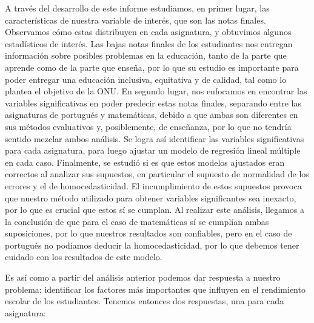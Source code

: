 \documentclass[
]{article}
\begin{document}
A través del desarrollo de este informe estudiamos, en primer lugar, las
características de nuestra variable de interés, que son las notas
finales. Observamos cómo estas distribuyen en cada asignatura, y
obtuvimos algunos estadísticos de interés. Las bajas notas finales de
los estudiantes nos entregan información sobre posibles problemas en la
educación, tanto de la parte que aprende como de la parte que enseña,
por lo que su estudio es importante para poder entregar una educación
inclusiva, equitativa y de calidad, tal como lo plantea el objetivo de
la ONU. En segundo lugar, nos enfocamos en encontrar las variables
significativas en poder predecir estas notas finales, separando entre
las asignaturas de portugués y matemáticas, debido a que ambas son
diferentes en sus métodos evaluativos y, posiblemente, de enseñanza, por
lo que no tendría sentido mezclar ambos análisis. Se logra así
identificar las variables significativas para cada asignatura, para
luego ajustar un modelo de regresión lineal múltiple en cada caso.
Finalmente, se estudió si es que estos modelos ajustados eran correctos
al analizar sus supuestos, en particular el supuesto de normalidad de
los errores y el de homocedasticidad. El incumplimiento de estos
supuestos provoca que nuestro método utilizado para obtener variables
significantes sea inexacto, por lo que es crucial que estos sí se
cumplan. Al realizar este análisis, llegamos a la conclusión de que para
el caso de matemáticas sí se cumplían ambas suposiciones, por lo que
nuestros resultados son confiables, pero en el caso de portugués no
podíamos deducir la homocedasticidad, por lo que debemos tener cuidado
con los resultados de este modelo.

Es así como a partir del análisis anterior podemos dar respuesta a
nuestro problema: identificar los factores más importantes que influyen
en el rendimiento escolar de los estudiantes. Tenemos entonces dos
respuestas, una para cada asignatura:
\end{document}
